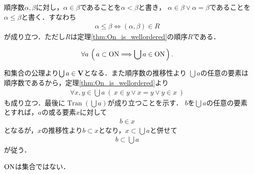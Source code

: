 	順序数$\alpha,\beta$に対し，$\alpha \in \beta$であることを$\alpha < \beta$と書き，
	$\alpha \in \beta \vee \alpha = \beta$であることを$\alpha \leq \beta$と書く．すなわち
	\begin{align}
		\alpha \leq \beta \Longleftrightarrow (\alpha,\beta) \in R
	\end{align}
	が成り立つ．ただし$R$は定理\ref{thm:On_is_wellordered}の順序$R$である．
	
	\begin{screen}
		\begin{thm}[$\ON$の部分集合の合併は順序数となる]\label{thm:union_of_set_of_ordinal_numbers_is_ordinal}
			\begin{align}
				\forall a\,
				\left(\, a \subset \mathrm{ON} \Longrightarrow \bigcup a \in \mathrm{ON}\, \right).
			\end{align}
		\end{thm}
	\end{screen}
	
	\begin{prf}
		和集合の公理より$\bigcup a \in \mathbf{V}$となる．また順序数の推移性より
		$\bigcup a$の任意の要素は順序数であるから，定理\ref{thm:On_is_wellordered}より
		\begin{align}
			\forall x,y \in \bigcup a\ (\ x \in y \vee x = y \vee y \in x\ )
		\end{align}
		も成り立つ．最後に$\operatorname{Tran}(\bigcup a)$が成り立つことを示す．
		$b$を$\bigcup a$の任意の要素とすれば，$a$の或る要素$x$に対して
		\begin{align}
			b \in x
		\end{align}
		となるが，$x$の推移性より$b \subset x$となり，$x \subset \bigcup a$と併せて
		\begin{align}
			b \subset \bigcup a
		\end{align}
		が従う．
		\QED
	\end{prf}
	
	\begin{screen}
		\begin{thm}
			$\ON$は集合ではない．
		\end{thm}
	\end{screen}
	
